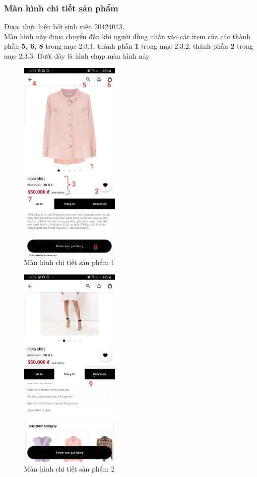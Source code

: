 \documentclass[12pt]{article}
\begin{document}
\subsubsection{Màn hình chi tiết sản phẩm}
Được thực hiện bởi sinh viên 20424013.\\

\indent Màn hình này được chuyển đến khi người dùng nhấn vào các item của các thành phần \textbf{5, 6, 8} trong mục 2.3.1, thành phần \textbf{1} trong mục 2.3.2, thành phần \textbf{2} trong mục 2.3.3. Dưới đây là hình chụp màn hình này.

\begin{figure}[H]
    \centering
    \includegraphics[height=10cm]{images/21.png}
    \caption{Màn hình chi tiết sản phẩm 1}
\end{figure}

\begin{figure}[H]
    \centering
    \includegraphics[height=10cm]{images/22.png}
    \caption{Màn hình chi tiết sản phẩm 2}
\end{figure}
\end{document}
